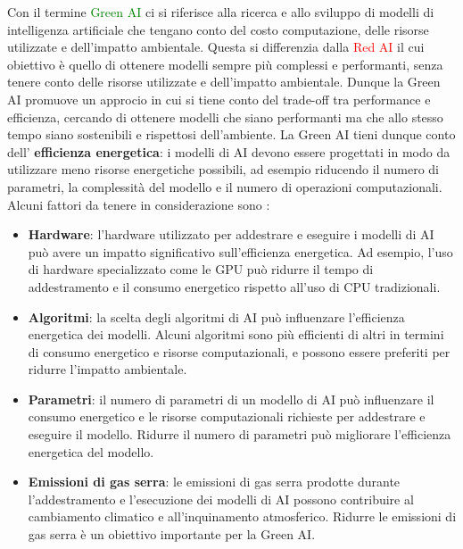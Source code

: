 \noindent Con il termine \textcolor{green}{Green AI} \cite{GreenAI} ci si riferisce alla ricerca e allo sviluppo di modelli di intelligenza artificiale che tengano conto del costo computazione, delle risorse utilizzate e dell'impatto ambientale. Questa si differenzia dalla \textcolor{red}{Red AI} \cite{GreenAI} il cui obiettivo è quello di ottenere modelli sempre più complessi e performanti, senza tenere conto delle risorse utilizzate e dell'impatto ambientale. Dunque la Green AI promuove un approcio in cui si tiene conto del trade-off tra performance e efficienza, cercando di ottenere modelli che siano performanti ma che allo stesso tempo siano sostenibili e rispettosi dell'ambiente.
La Green AI tieni dunque conto dell' \textbf{efficienza energetica}: i modelli di AI devono essere progettati in modo da utilizzare meno risorse energetiche possibili, ad esempio riducendo il numero di parametri, la complessità del modello e il numero di operazioni computazionali.
Alcuni fattori da tenere in considerazione sono \cite{GreenAI}:
\begin{itemize}
    \item \textbf{Hardware}: l'hardware utilizzato per addestrare e eseguire i modelli di AI può avere un impatto significativo sull'efficienza energetica. Ad esempio, l'uso di hardware specializzato come le GPU può ridurre il tempo di addestramento e il consumo energetico rispetto all'uso di CPU tradizionali.
    \item \textbf{Algoritmi}: la scelta degli algoritmi di AI può influenzare l'efficienza energetica dei modelli. Alcuni algoritmi sono più efficienti di altri in termini di consumo energetico e risorse computazionali, e possono essere preferiti per ridurre l'impatto ambientale.
    \item \textbf{Parametri}: il numero di parametri di un modello di AI può influenzare il consumo energetico e le risorse computazionali richieste per addestrare e eseguire il modello. Ridurre il numero di parametri può migliorare l'efficienza energetica del modello.
    \item \textbf{Emissioni di gas serra}: le emissioni di gas serra prodotte durante l'addestramento e l'esecuzione dei modelli di AI possono contribuire al cambiamento climatico e all'inquinamento atmosferico. Ridurre le emissioni di gas serra è un obiettivo importante per la Green AI.
\end{itemize}


